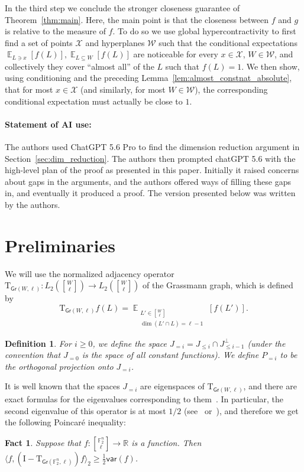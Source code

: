 \documentclass[11pt]{article}
\newtheorem{fact}[thm]{Fact}
\newtheorem{definition}[thm]{Definition}
\newcommand\Expect[2]{{\mathop{\mathbb{E}}_{#1}\left[ {#2} \right]}}
\newcommand\inner[2]{\langle{#1},{#2}\rangle}
\renewcommand\geq{\geqslant}
\renewcommand\leq{\leqslant}
\providecommand{\sqbinom}[2]{\genfrac{[}{]}{0pt}{}{#1}{#2}}
\begin{document}
In the third step we conclude the stronger closeness guarantee of Theorem~\ref{thm:main}. Here, the main point is that the closeness between $f$ and $g$ is relative to the measure of $f$. To do so we use global hypercontractivity to first find a set of points $\mathcal{X}$ and hyperplanes $\mathcal{W}$ such that the conditional expectations 
$\Expect{L\ni x}{f(L)},\Expect{L\subseteq W}{f(L)}$ are noticeable for every $x\in\mathcal{X}$, $W\in\mathcal{W}$, and collectively they cover ``almost all'' of the $L$ such that $f(L)=1$. We then show, using conditioning and the preceding Lemma~\ref{lem:almost_constnat_absolute}, that for most $x\in\mathcal{X}$ (and similarly, for most $W\in\mathcal{W}$), the corresponding conditional expectation must actually be close to $1$.
\vspace{-2ex}
\paragraph{Statement of AI use:} The authors used ChatGPT 5.6 Pro to find the dimension reduction argument in Section~\ref{sec:dim_reduction}. The authors then prompted chatGPT 5.6 with the high-level plan of the proof as presented in this paper. Initially it raised concerns about gaps in the arguments, and the authors offered ways of filling these gaps in, and eventually it produced a proof. The version presented below was written by the authors.
\section{Preliminaries}
We will use the normalized adjacency operator $\mathrm{T}_{\mathsf{Gr}(W,\ell)}\colon L_2({\sqbinom{W}{\ell}})\to L_2({\sqbinom{W}{\ell}})$ of the Grassmann graph, which is defined by 
\[
\mathrm{T}_{\mathsf{Gr}(W,\ell)}f(L)
=\Expect{\substack{L'\in{\sqbinom{W}{\ell}}\\ \dim(L'\cap L)=\ell-1}}{f(L')}.
\]
\begin{definition}
    For $i\geq 0$, we define the space $J_{=i} = J_{\leq i}\cap J_{\leq i-1}^{\perp}$ (under the convention that $J_{=0}$ is the space of all constant functions). We define $P_{=i}$ to be the orthogonal projection onto $J_{=i}$.
\end{definition}

It is well known that the spaces $J_{=i}$ are eigenspaces of $\mathrm{T}_{\mathsf{Gr}(W,\ell)}$, and there are exact formulas for the eigenvalues corresponding to them~\cite{BCN1989,GodsilMeagher2016}. In particular, the second eigenvalue of this operator is at most $1/2$ (see~\cite[Theorem 9.3.3]{BCN1989} or~\cite[Section~9.6, Theorem~9.6.3]{GodsilMeagher2016}), and therefore we get the following Poincar\'e inequality:
\begin{fact}\label{fact:poincare}
  Suppose that $f\colon {\sqbinom{\mathbb{F}_2^n}{\ell}}\to\mathbb{R}$ is a function. Then
  $\inner{f}{(\mathrm{I}-\mathrm{T}_{\mathsf{Gr}(\mathbb{F}_2^n,\ell)})f}_2\geq \frac{1}{2}\mathsf{var}(f)$.
\end{fact}
\end{document}
